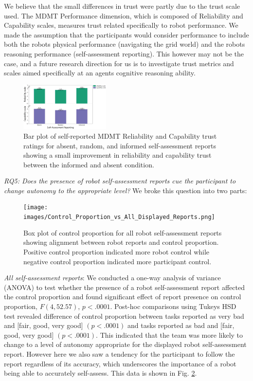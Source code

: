 \documentclass[aaai]{article}
\begin{document}
We believe that the small differences in trust were partly due to the trust scale used. The MDMT Performance dimension, which is composed of Reliability and Capability scales, measures trust related specifically to robot performance. We made the assumption that the participants would consider performance to include both the robots physical performance (navigating the grid world) and the robots reasoning performance (self-assessment reporting). This however may not be the case, and a future research direction for us is to investigate trust metrics and scales aimed specifically at an agents cognitive reasoning ability.

\begin{figure}[htbp]
\centering
\includegraphics[width=0.4\textwidth]{images/trust_vs_reporting.png}
\caption{Bar plot of self-reported MDMT Reliability and Capability trust ratings for absent, random, and informed self-assessment reports showing a small improvement in reliability and capability trust between the informed and absent condition.}
\label{fig:TRUST_VS_ACCURACY}
\end{figure}

\emph{RQ5: Does the presence of robot self-assessment reports cue the participant to change autonomy to the appropriate level?} We broke this question into two parts:

\begin{figure}[htbp]
\centering
\texttt{[image: images/Control\_Proportion\_vs\_All\_Displayed\_Reports.png]}
\caption{Box plot of control proportion for all robot self-assessment reports showing alignment between robot reports and control proportion. Positive control proportion indicated more robot control while negative control proportion indicated more participant control.}
\label{fig:CONT_PROP_VS_ALL_SINGLE_REPORTS}
\end{figure}

\emph{All self-assessment reports}: We conducted a one-way analysis of variance (ANOVA) to test whether the presence of a robot self-assessment report affected the control proportion and found significant effect of report presence on control proportion, $F(4, 52.57)$, $p <.0001$. Post-hoc comparisons using Tukeys HSD test revealed difference of control proportion between tasks reported as very bad and [fair, good, very good] $(p< .0001)$ and tasks reported as bad  and [fair, good, very good] $(p<.0001)$. This indicated that the team was more likely to change to a level of autonomy appropriate for the displayed robot self-assessment report. However here we also saw a tendency for the participant to follow the report regardless of its accuracy, which underscores the importance of a robot being able to accurately self-assess. This data is shown in Fig. \ref{fig:CONT_PROP_VS_ALL_SINGLE_REPORTS}.
\end{document}
